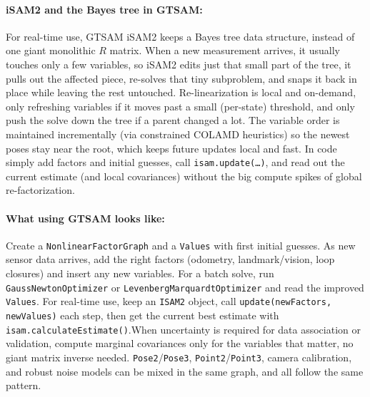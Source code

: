 \paragraph{iSAM2 and the Bayes tree in GTSAM:}
For real-time use, GTSAM iSAM2 keeps a Bayes tree data structure, instead of one giant monolithic $R$ matrix. When a new measurement arrives, it usually touches only a few variables, so iSAM2 edits just that small part of the tree, it pulls out the affected piece, re-solves that tiny subproblem, and snaps it back in place while leaving the rest untouched. Re-linearization is local and on-demand, only refreshing variables if it moves past a small (per-state) threshold, and only push the solve down the tree if a parent changed a lot. The variable order is maintained incrementally (via constrained COLAMD heuristics) so the newest poses stay near the root, which keeps future updates local and fast. In code simply add factors and initial guesses, call \texttt{isam.update(\dots)}, and read out the current estimate (and local covariances) without the big compute spikes of global re-factorization. \cite{GTSAM_handbook}

\paragraph{What using GTSAM looks like:}
Create a \texttt{NonlinearFactorGraph} and a \texttt{Values} with first initial guesses. As new sensor data arrives, add the right factors (odometry, landmark/vision, loop closures) and insert any new variables. For a batch solve, run \texttt{GaussNewtonOptimizer} or \texttt{LevenbergMarquardtOptimizer} and read the improved \texttt{Values}. For real-time use, keep an \texttt{ISAM2} object, call \texttt{update(newFactors, newValues)} each step, then get the current best estimate with \texttt{isam.calculateEstimate()}.When uncertainty is required for data association or validation, compute marginal covariances only for the variables that matter, no giant matrix inverse needed. \texttt{Pose2}/\texttt{Pose3}, \texttt{Point2}/\texttt{Point3}, camera calibration, and robust noise models can be mixed in the same graph, and all follow the same pattern. \cite{GTSAM_handbook}

